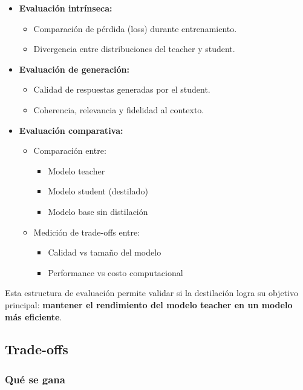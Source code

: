 \documentclass[12pt]{article}
\begin{document}
	\begin{itemize}
		\item \textbf{Evaluación intrínseca:}
		\begin{itemize}
			\item Comparación de pérdida (loss) durante entrenamiento.
			\item Divergencia entre distribuciones del teacher y student.
		\end{itemize}
		
		\item \textbf{Evaluación de generación:}
		\begin{itemize}
			\item Calidad de respuestas generadas por el student.
			\item Coherencia, relevancia y fidelidad al contexto.
		\end{itemize}
		
		\item \textbf{Evaluación comparativa:}
		\begin{itemize}
			\item Comparación entre:
			\begin{itemize}
				\item Modelo teacher
				\item Modelo student (destilado)
				\item Modelo base sin distilación
			\end{itemize}
			
			\item Medición de trade-offs entre:
			\begin{itemize}
				\item Calidad vs tamaño del modelo
				\item Performance vs costo computacional
			\end{itemize}
		\end{itemize}
	\end{itemize}
	
	Esta estructura de evaluación permite validar si la destilación logra su objetivo principal: \textbf{mantener el rendimiento del modelo teacher en un modelo más eficiente}.
	
	\subsection{Trade-offs}
	
	\subsubsection{Qué se gana}
	
\end{document}
